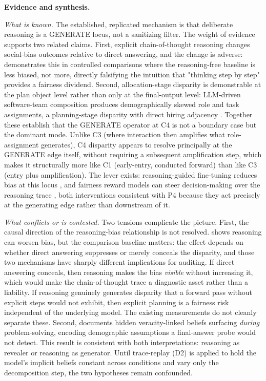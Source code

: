 \documentclass[10pt]{article}
\begin{document}
\textbf{Evidence and synthesis.}

\emph{What is known.} The established, replicated mechanism is that deliberate reasoning is a GENERATE locus, not a sanitizing filter. The weight of evidence supports two related claims. First, explicit chain-of-thought reasoning changes social-bias outcomes relative to direct answering, and the change is adverse: \cite{wu2025reasoning} demonstrates this in controlled comparisons where the reasoning-free baseline is less biased, not more, directly falsifying the intuition that "thinking step by step" provides a fairness dividend. Second, allocation-stage disparity is demonstrable at the plan object level rather than only at the final-output level: LLM-driven software-team composition produces demographically skewed role and task assignments, a planning-stage disparity with direct hiring adjacency \cite{parziale2026once}. Together these establish that the GENERATE operator at C4 is not a boundary case but the dominant mode. Unlike C3 (where interaction then amplifies what role-assignment generates), C4 disparity appears to resolve principally at the GENERATE edge itself, without requiring a subsequent amplification step, which makes it structurally more like C1 (early-entry, conducted forward) than like C3 (entry plus amplification). The lever exists: reasoning-guided fine-tuning reduces bias at this locus \cite{kabra2025reasoning}, and fairness reward models can steer decision-making over the reasoning trace \cite{hall2025guiding}, both interventions consistent with P4 because they act precisely at the generating edge rather than downstream of it.

\emph{What conflicts or is contested.} Two tensions complicate the picture. First, the causal direction of the reasoning-bias relationship is not resolved. \cite{wu2025reasoning} shows reasoning can worsen bias, but the comparison baseline matters: the effect depends on whether direct answering suppresses or merely conceals the disparity, and those two mechanisms have sharply different implications for auditing. If direct answering conceals, then reasoning makes the bias \emph{visible} without increasing it, which would make the chain-of-thought trace a diagnostic asset rather than a liability. If reasoning genuinely generates disparity that a forward pass without explicit steps would not exhibit, then explicit planning is a fairness risk independent of the underlying model. The existing measurements do not cleanly separate these. Second, \cite{zhou2025veracity} documents hidden veracity-linked beliefs surfacing \emph{during} problem-solving, encoding demographic assumptions a final-answer probe would not detect. This result is consistent with both interpretations: reasoning as revealer or reasoning as generator. Until trace-replay (D2) is applied to hold the model's implicit beliefs constant across conditions and vary only the decomposition step, the two hypotheses remain confounded.
\end{document}
